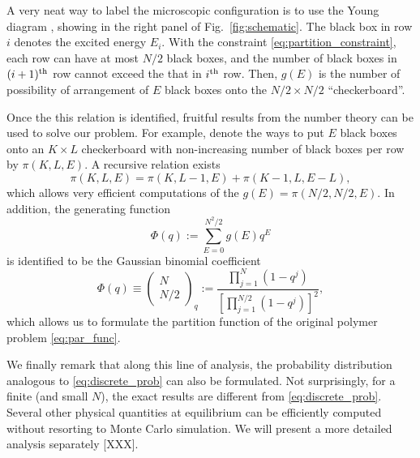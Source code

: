 \documentclass[twocolumn,showpacs,preprintnumbers,amsmath,amssymb,pre]{revtex4-1}
\renewcommand{\l}{\left}
\renewcommand{\r}{\right}
\newcommand{\eq}[2]{\begin{equation}#1\label{#2}\end{equation}}
\begin{document}
A very neat way to label the microscopic configuration is to use the Young diagram \cite{andrews1998theory}, showing in the right panel of Fig.~\ref{fig:schematic}. The black box in row $i$ denotes the excited energy $E_i$. With the constraint \eqref{eq:partition_constraint}, each row can have at most $N/2$ black boxes, and the number of black boxes in $(i+1)^{\rm th}$ row cannot exceed the that in $i^{\rm th}$ row.  Then, $g(E)$ is the number of possibility of arrangement of $E$ black boxes onto the $N/2 \times N/2$ ``checkerboard''.

Once the this relation is identified, fruitful results from the number theory \cite{andrews1998theory} can be used to solve our problem. For example, denote  the ways to put $E$ black boxes onto an $K \times L$ checkerboard with non-increasing number of black boxes per row by $\pi \l(K,L,E\r)$. A recursive relation exists \cite{andrews1998theory}
\eq{
\pi\l(K,L,E\r) = \pi\l(K,L-1,E\r) + \pi \l(K-1,L, E-L\r),
}{}
which allows very efficient computations of the $g(E)=\pi\l(N/2,N/2,E\r)$. In addition, the generating function 
\eq{
\Phi \l(q\r) := \sum_{E=0}^{N^2/2} g(E) q^E
}{}
is identified to be the Gaussian binomial coefficient
\eq{
\Phi \l(q\r) \equiv \l(\begin{array}{c} N \\ N/2 \end{array}\r)_q := \frac{\prod_{j=1}^{N} \l(1-q^j\r)}{\l[\prod_{j=1}^{N/2} \l(1-q^j\r)\r]^2},
}{}
which allows us to formulate the partition function of the original polymer problem \eqref{eq:par_func}. 

We finally remark that along this line of analysis, the probability distribution analogous to \eqref{eq:discrete_prob} can also be formulated. Not surprisingly, for a finite (and small $N$), the exact results are different from \eqref{eq:discrete_prob}. Several other physical quantities at equilibrium can be efficiently computed without resorting to Monte Carlo simulation. We will present a more detailed analysis separately [XXX].  


\end{document}

